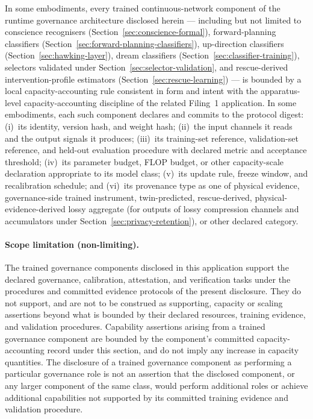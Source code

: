 \documentclass[a4paper,12pt]{article}
\begin{document}
In some embodiments, every trained continuous-network component of
the runtime governance architecture disclosed herein --- including but
not limited to conscience recognisers
(Section~\ref{sec:conscience-formal}), forward-planning classifiers
(Section~\ref{sec:forward-planning-classifiers}), up-direction
classifiers (Section~\ref{sec:hawking-layer}), dream classifiers
(Section~\ref{sec:classifier-training}), selectors validated under
Section~\ref{sec:selector-validation}, and rescue-derived
intervention-profile estimators (Section~\ref{sec:rescue-learning})
--- is bounded by a local capacity-accounting rule consistent in
form and intent with the apparatus-level capacity-accounting
discipline of the related Filing~1 application. In some embodiments,
each such component declares and commits to the protocol digest:
(i)~its identity, version hash, and weight hash; (ii)~the input
channels it reads and the output signals it produces; (iii)~its
training-set reference, validation-set reference, and held-out
evaluation procedure with declared metric and acceptance threshold;
(iv)~its parameter budget, FLOP budget, or other capacity-scale
declaration appropriate to its model class; (v)~its update rule,
freeze window, and recalibration schedule; and (vi)~its provenance
type as one of physical evidence, governance-side trained instrument,
twin-predicted, rescue-derived, physical-evidence-derived lossy
aggregate (for outputs of lossy compression channels and accumulators
under Section~\ref{sec:privacy-retention}), or other declared
category.

\paragraph{Scope limitation (non-limiting).}
The trained governance components disclosed in this application
support the declared governance, calibration, attestation, and
verification tasks under the procedures and committed evidence
protocols of the present disclosure. They do not support, and are
not to be construed as supporting, capacity or scaling assertions
beyond what is bounded by their declared resources, training
evidence, and validation procedures. Capability assertions arising
from a trained governance component are bounded by the component's
committed capacity-accounting record under this section, and do not
imply any increase in capacity quantities. The disclosure of a
trained governance component as performing a particular governance
role is not an assertion that the disclosed component, or any larger
component of the same class, would perform additional roles or
achieve additional capabilities not supported by its committed
training evidence and validation procedure.
\end{document}
